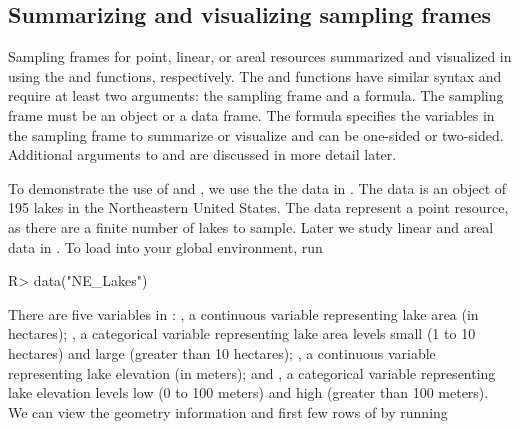 \documentclass[
  shortnames]{jss}
\begin{document}
\hypertarget{subsec:sv_sframe}{%
\subsection{Summarizing and visualizing sampling
frames}\label{subsec:sv_sframe}}

Sampling frames for point, linear, or areal resources summarized and
visualized in  using the  and
 functions, respectively. The  and
 functions have similar syntax and require at least two
arguments: the sampling frame and a formula. The sampling frame must be
an  object \citep{pebesma2018sf} or a data frame. The formula
specifies the variables in the sampling frame to summarize or visualize
and can be one-sided or two-sided. Additional arguments to
 and  are discussed in more detail later.

To demonstrate the use of  and , we use the
the  data in . The  data is
an  object of 195 lakes in the Northeastern United States. The
 data represent a point resource, as there are a finite
number of lakes to sample. Later we study linear and areal data in
. To load  into your global environment,
run

\begin{CodeChunk}
\begin{CodeInput}
R> data("NE_Lakes")
\end{CodeInput}
\end{CodeChunk}

There are five variables in : , a continuous
variable representing lake area (in hectares); , a
categorical variable representing lake area levels small (1 to 10
hectares) and large (greater than 10 hectares); , a
continuous variable representing lake elevation (in meters); and
, a categorical variable representing lake elevation
levels low (0 to 100 meters) and high (greater than 100 meters). We can
view the geometry information and first few rows of  by
running
\end{document}
